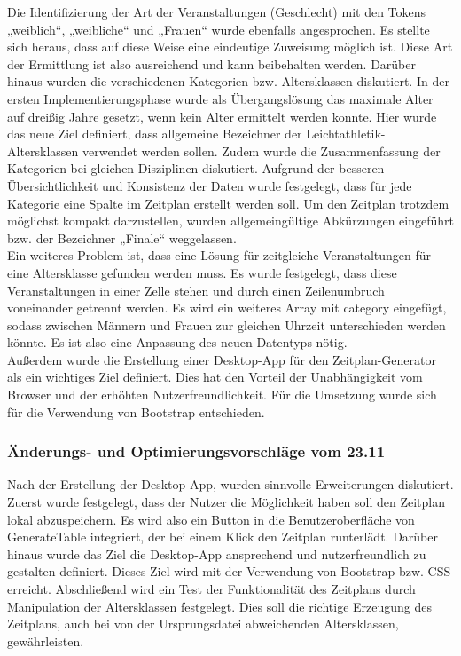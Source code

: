 {Die Identifizierung der Art der Veranstaltungen (Geschlecht) mit den Tokens „weiblich“, „weibliche“ und „Frauen“ wurde ebenfalls angesprochen. Es stellte sich heraus, dass auf diese Weise eine eindeutige Zuweisung möglich ist. Diese Art der Ermittlung ist also ausreichend und kann beibehalten werden.
Darüber hinaus wurden die verschiedenen Kategorien bzw. Altersklassen diskutiert. In der ersten Implementierungsphase wurde als Übergangslösung das maximale Alter auf dreißig Jahre gesetzt, wenn kein Alter ermittelt werden konnte. Hier wurde das neue Ziel definiert, dass allgemeine Bezeichner der Leichtathletik-Altersklassen verwendet werden sollen. Zudem wurde die Zusammenfassung der Kategorien bei gleichen Disziplinen diskutiert. Aufgrund der besseren Übersichtlichkeit und Konsistenz der Daten wurde festgelegt, dass für jede Kategorie eine Spalte im Zeitplan erstellt werden soll. Um den Zeitplan trotzdem möglichst kompakt darzustellen, wurden allgemeingültige Abkürzungen eingeführt bzw. der Bezeichner „Finale“ weggelassen. \\
Ein weiteres Problem ist, dass eine Lösung für zeitgleiche Veranstaltungen für eine Altersklasse gefunden werden muss. Es wurde festgelegt, dass diese Veranstaltungen in einer Zelle stehen und durch einen Zeilenumbruch voneinander getrennt werden. Es wird ein weiteres Array mit category eingefügt, sodass zwischen Männern und Frauen zur gleichen Uhrzeit unterschieden werden könnte. Es ist also eine Anpassung des neuen Datentyps nötig.\\
Außerdem wurde die Erstellung einer Desktop-App für den Zeitplan-Generator als ein wichtiges Ziel definiert. Dies hat den Vorteil der Unabhängigkeit vom Browser und der erhöhten Nutzerfreundlichkeit. Für die Umsetzung wurde sich für die Verwendung von Bootstrap entschieden.

\subsubsection{Änderungs- und Optimierungsvorschläge vom 23.11}
Nach der Erstellung der Desktop-App, wurden sinnvolle Erweiterungen diskutiert. Zuerst wurde festgelegt, dass der Nutzer die Möglichkeit haben soll den Zeitplan lokal abzuspeichern. Es wird also ein Button in die Benutzeroberfläche von GenerateTable integriert, der bei einem Klick den Zeitplan runterlädt.
Darüber hinaus wurde das Ziel die Desktop-App ansprechend und nutzerfreundlich zu gestalten definiert. Dieses Ziel wird mit der Verwendung von Bootstrap bzw. CSS erreicht.
Abschließend wird ein Test der Funktionalität des Zeitplans durch Manipulation der Altersklassen festgelegt. Dies soll die richtige Erzeugung des Zeitplans, auch bei von der Ursprungsdatei abweichenden Altersklassen, gewährleisten.

}
